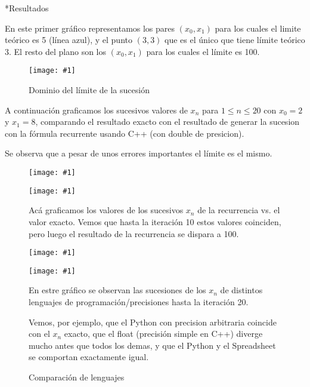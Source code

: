 \documentclass[12pt,titlepage]{article}
\newcommand{\gras}[2]{\noindent\texttt{[image: \#1]}\\}
\newenvironment{usection}[1]{\newpage\begin{section}*{#1}	\addcontentsline{toc}{section}{#1}}{\end{section}}
\begin{document}
	\begin{usection}{Resultados}

		En este primer gráfico representamos los pares $(x_0,x_1)$ para los cuales el limite teórico es 5 (línea azul),
		y el punto $(3,3)$ que es el único que tiene límite teórico 3.
		El resto del plano son los $(x_0,x_1)$ para los cuales el límite es 100.
		
		\begin{figure}[H]
			\centering
			\caption{Dominio del límite de la sucesión}
			\label{fig:dominio}
				\gras{lim5.png}{.6}
		\end{figure}
		
		\newpage
		A continuación graficamos los sucesivos valores de $x_n$ para $1\leq n\leq 20$ con $x_0=2$ y $x_1=8$, comparando el resultado exacto con el resultado de generar la sucesion con la fórmula recurrente usando C++ (con double de presicion).
		
		Se observa que a pesar de unos errores importantes el límite es el mismo.
		
		\begin{figure}[H]
			\centering
				\gras{fig_2_8_20.png}{.6}
		\end{figure}
		
		\begin{figure}[H]
			\centering
			\caption{Acá graficamos los valores de los sucesivos $x_n$ de la recurrencia vs. el valor exacto. Vemos que hasta la iteración 10 estos valores coinciden, pero luego el resultado de la recurrencia se dispara a 100.}
			\label{fig:comparaciones}
				\gras{fig_4_4-25_10.png}{.5}
		\end{figure}
		\begin{figure}[H]
			\centering
				\gras{fig_4_4-25_20.png}{.6}
		\end{figure}

		\noindent\begin{figure}[H]
			{\centering
			\caption{Comparación de lenguajes}
			\label{fig:comparaciones}
			\gras{fig_comparaciones.png}{.8}}
			En estre gráfico se observan las sucesiones de los $x_n$ de distintos lenguajes de programación/precisiones hasta la iteración 20.

			Vemos, por ejemplo, que el Python con precision arbitraria coincide con el $x_n$ exacto, que el float (precisión simple en C++) diverge mucho antes que todos los demas, y que el Python y el Spreadsheet se comportan exactamente igual.


\end{figure}
\end{usection}
\end{document}
